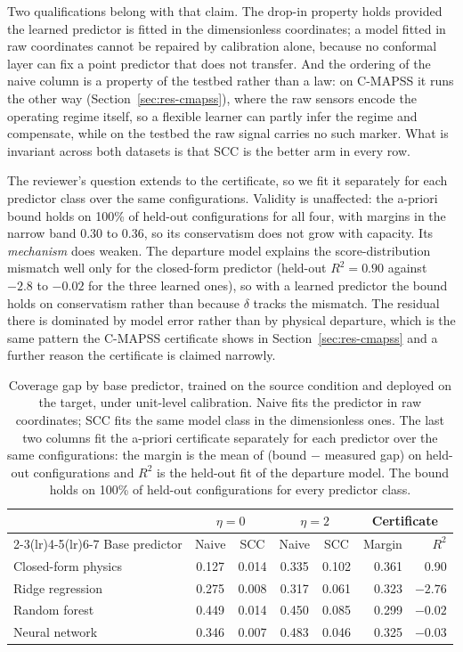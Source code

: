 \documentclass[review,times]{elsarticle}
\theoremstyle{definition}
\theoremstyle{remark}
\begin{document}
Two qualifications belong with that claim. The drop-in property holds provided the learned
predictor is fitted in the dimensionless coordinates; a model fitted in raw coordinates cannot be
repaired by calibration alone, because no conformal layer can fix a point predictor that does not
transfer. And the ordering of the naive column is a property of the testbed rather than a law: on
C-MAPSS it runs the other way (Section~\ref{sec:res-cmapss}), where the raw sensors encode the
operating regime itself, so a flexible learner can partly infer the regime and compensate, while on
the testbed the raw signal carries no such marker. What is invariant across both datasets is that
SCC is the better arm in every row.

The reviewer's question extends to the certificate, so we fit it separately for each predictor
class over the same configurations. Validity is unaffected: the a-priori bound holds on 100\% of
held-out configurations for all four, with margins in the narrow band 0.30 to 0.36, so its
conservatism does not grow with capacity. Its \emph{mechanism} does weaken. The departure model
explains the score-distribution mismatch well only for the closed-form predictor (held-out
$R^2=0.90$ against $-2.8$ to $-0.02$ for the three learned ones), so with a learned predictor the
bound holds on conservatism rather than because $\delta$ tracks the mismatch. The residual there is
dominated by model error rather than by physical departure, which is the same pattern the C-MAPSS
certificate shows in Section~\ref{sec:res-cmapss} and a further reason the certificate is claimed
narrowly.

\begin{table}[t]\centering\footnotesize
\setlength{\tabcolsep}{10pt}\renewcommand{\arraystretch}{1.2}
\caption{Coverage gap by base predictor, trained on the source condition and deployed on the
target, under unit-level calibration. Naive fits the predictor in raw coordinates; SCC fits the same
model class in the dimensionless ones. The last two columns fit the a-priori certificate separately
for each predictor over the same configurations: the margin is the mean of (bound $-$ measured gap)
on held-out configurations and $R^2$ is the held-out fit of the departure model. The bound holds on
100\% of held-out configurations for every predictor class.}\label{tab:basemodel}
\begin{tabular}{@{}lccccrr@{}}\toprule
& \multicolumn{2}{c}{$\eta=0$} & \multicolumn{2}{c}{$\eta=2$}
& \multicolumn{2}{c}{Certificate} \\\cmidrule(lr){2-3}\cmidrule(lr){4-5}\cmidrule(lr){6-7}
Base predictor & Naive & SCC & Naive & SCC & Margin & $R^2$ \\\midrule
Closed-form physics & 0.127 & 0.014 & 0.335 & 0.102 & 0.361 & 0.90 \\
Ridge regression    & 0.275 & 0.008 & 0.317 & 0.061 & 0.323 & $-2.76$ \\
Random forest       & 0.449 & 0.014 & 0.450 & 0.085 & 0.299 & $-0.02$ \\
Neural network      & 0.346 & 0.007 & 0.483 & 0.046 & 0.325 & $-0.03$ \\\bottomrule
\end{tabular}
\end{table}
\end{document}
